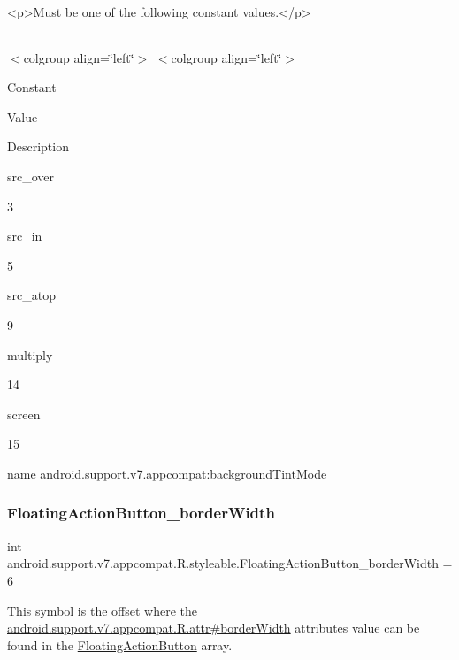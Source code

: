 \begin{DoxyVerb}      <p>Must be one of the following constant values.</p>
\end{DoxyVerb}
 \tabulinesep=1mm
\begin{longtabu} spread 0pt [c]{*{0}{|X[-1]}|}
\hline
\end{longtabu}
$<$colgroup align=\char`\"{}left\char`\"{}$>$ $<$colgroup align=\char`\"{}left\char`\"{}$>$ 

Constant

Value

Description 

{\ttfamily src\+\_\+over}

3

{\ttfamily src\+\_\+in}

5

{\ttfamily src\+\_\+atop}

9

{\ttfamily multiply}

14

{\ttfamily screen}

15

name android.\+support.\+v7.\+appcompat\+:background\+Tint\+Mode \mbox{\label{classandroid_1_1support_1_1v7_1_1appcompat_1_1R_1_1styleable_a90c9e09b5a738fa569f0bf4b9cbe536e}} 
\subsubsection{\texorpdfstring{Floating\+Action\+Button\+\_\+border\+Width}{FloatingActionButton\_borderWidth}}
{\footnotesize\ttfamily int android.\+support.\+v7.\+appcompat.\+R.\+styleable.\+Floating\+Action\+Button\+\_\+border\+Width = 6\hspace{0.3cm}{\ttfamily [static]}}

This symbol is the offset where the \hyperlink{classandroid_1_1support_1_1v7_1_1appcompat_1_1R_1_1attr_a55e8c33b36302cff431e988e21390c49}{android.\+support.\+v7.\+appcompat.\+R.\+attr\#border\+Width} attribute\textquotesingle{}s value can be found in the \hyperlink{classandroid_1_1support_1_1v7_1_1appcompat_1_1R_1_1styleable_a9bfca89352160169125a89277e9fb2a1}{Floating\+Action\+Button} array.

